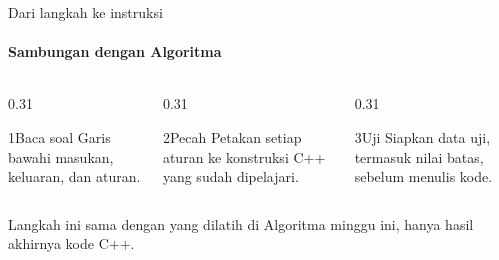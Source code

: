 \documentclass[t]{beamer}
\begin{document}
\begin{frame}{Dari langkah ke instruksi}
\framesubtitle{Sambungan dengan Algoritma}
\begin{columns}[T]
\begin{column}{0.31\textwidth}
\begin{Langkah}{1}{Baca soal}
Garis bawahi masukan, keluaran, dan aturan.
\end{Langkah}
\end{column}
\begin{column}{0.31\textwidth}
\begin{Langkah}{2}{Pecah}
Petakan setiap aturan ke konstruksi C++ yang sudah dipelajari.
\end{Langkah}
\end{column}
\begin{column}{0.31\textwidth}
\begin{Langkah}{3}{Uji}
Siapkan data uji, termasuk nilai batas, sebelum menulis kode.
\end{Langkah}
\end{column}
\end{columns}
\vspace{10pt}
Langkah ini sama dengan yang dilatih di Algoritma minggu ini, hanya hasil akhirnya kode C++.
\end{frame}

\end{document}
